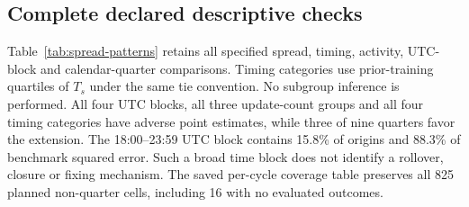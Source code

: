 \documentclass[12pt,letterpaper]{article}
\begin{document}
\subsection{Complete declared descriptive checks}

Table~\ref{tab:spread-patterns} retains all specified spread, timing, activity, UTC-block and calendar-quarter comparisons. Timing categories use prior-training quartiles of $T_s$ under the same tie convention. No subgroup inference is performed. All four UTC blocks, all three update-count groups and all four timing categories have adverse point estimates, while three of nine quarters favor the extension. The 18:00--23:59 UTC block contains 15.8\% of origins and 88.3\% of benchmark squared error. Such a broad time block does not identify a rollover, closure or fixing mechanism. The saved per-cycle coverage table preserves all 825 planned non-quarter cells, including 16 with no evaluated outcomes.
\end{document}
